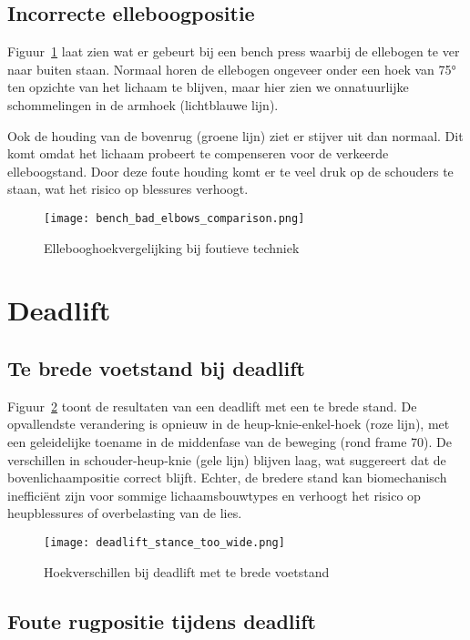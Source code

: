 \subsection{Incorrecte elleboogpositie}

Figuur~\ref{fig:bad_elbows} laat zien wat er gebeurt bij een bench press waarbij de ellebogen te ver naar buiten staan. 
Normaal horen de ellebogen ongeveer onder een hoek van 75° ten opzichte van het lichaam te blijven, maar hier zien we onnatuurlijke schommelingen in de armhoek (lichtblauwe lijn).

Ook de houding van de bovenrug (groene lijn) ziet er stijver uit dan normaal. 
Dit komt omdat het lichaam probeert te compenseren voor de verkeerde elleboogstand. 
Door deze foute houding komt er te veel druk op de schouders te staan, wat het risico op blessures verhoogt.

\begin{figure}[h]
\centering
\texttt{[image: bench\_bad\_elbows\_comparison.png]}
\caption{Ellebooghoekvergelijking bij foutieve techniek}
\label{fig:bad_elbows}
\end{figure}

\section{Deadlift}
\subsection{Te brede voetstand bij deadlift}

Figuur~\ref{fig:deadlift_stance_wide} toont de resultaten van een deadlift met een te brede stand.
De opvallendste verandering is opnieuw in de heup-knie-enkel-hoek (roze lijn), met een geleidelijke toename in de middenfase van de beweging (rond frame 70). 
De verschillen in schouder-heup-knie (gele lijn) blijven laag, wat suggereert dat de bovenlichaampositie correct blijft.
Echter, de bredere stand kan biomechanisch inefficiënt zijn voor sommige lichaamsbouwtypes en verhoogt het risico op heupblessures of overbelasting van de lies.

\begin{figure}[h]
\centering
\texttt{[image: deadlift\_stance\_too\_wide.png]}
\caption{Hoekverschillen bij deadlift met te brede voetstand}
\label{fig:deadlift_stance_wide}
\end{figure}

\subsection{Foute rugpositie tijdens deadlift}

